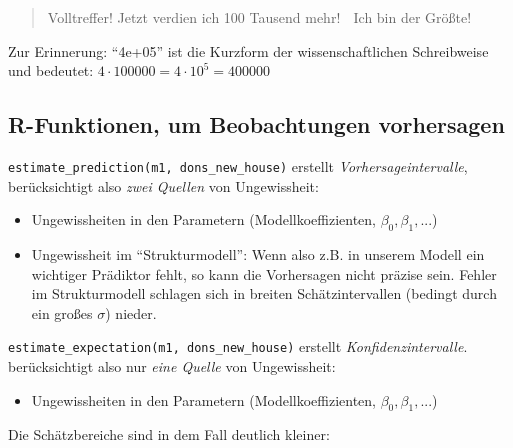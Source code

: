 \documentclass[
  a4paper,
  DIV=11]{scrreprt}
\providecommand{\tightlist}{%
  \setlength{\itemsep}{0pt}\setlength{\parskip}{0pt}}\usepackage{longtable,booktabs,array}
\theoremstyle{definition}
\theoremstyle{remark}
\begin{document}
\begin{quote}
Volltreffer! Jetzt verdien ich 100 Tausend mehr! 🤑 Ich bin der Größte!
🧑
\end{quote}

\begin{tcolorbox}[enhanced jigsaw, left=2mm, colframe=quarto-callout-note-color-frame, opacityback=0, arc=.35mm, rightrule=.15mm, breakable, toptitle=1mm, colbacktitle=quarto-callout-note-color!10!white, colback=white, coltitle=black, bottomrule=.15mm, titlerule=0mm, opacitybacktitle=0.6, bottomtitle=1mm, title=\textcolor{quarto-callout-note-color}{\faInfo}\hspace{0.5em}{Hinweis}, toprule=.15mm, leftrule=.75mm]
Zur Erinnerung: ``4e+05'' ist die Kurzform der wissenschaftlichen
Schreibweise und bedeutet: \(4 \cdot 100000 = 4\cdot10^5 = 400000\)
\end{tcolorbox}

\hypertarget{r-funktionen-um-beobachtungen-vorhersagen}{%
\subsection{R-Funktionen, um Beobachtungen
vorhersagen}\label{r-funktionen-um-beobachtungen-vorhersagen}}

\texttt{estimate\_prediction(m1,\ dons\_new\_house)} erstellt
\emph{Vorhersageintervalle}, berücksichtigt also \emph{zwei Quellen} von
Ungewissheit:

\begin{itemize}
\tightlist
\item
  Ungewissheiten in den Parametern (Modellkoeffizienten,
  \(\beta_0, \beta_1, ...\))
\item
  Ungewissheit im ``Strukturmodell'': Wenn also z.B. in unserem Modell
  ein wichtiger Prädiktor fehlt, so kann die Vorhersagen nicht präzise
  sein. Fehler im Strukturmodell schlagen sich in breiten
  Schätzintervallen (bedingt durch ein großes \(\sigma\)) nieder.
\end{itemize}

\texttt{estimate\_expectation(m1,\ dons\_new\_house)} erstellt
\emph{Konfidenzintervalle}. berücksichtigt also nur \emph{eine Quelle}
von Ungewissheit:

\begin{itemize}
\tightlist
\item
  Ungewissheiten in den Parametern (Modellkoeffizienten,
  \(\beta_0, \beta_1, ...\))
\end{itemize}

Die Schätzbereiche sind in dem Fall deutlich kleiner:
\end{document}
